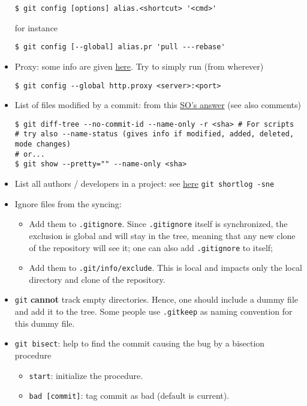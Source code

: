 \documentclass[a4paper,12pt,%
              final%
              ]{article}
\begin{document}
\begin{itemize}
\begin{verbatim}
$ git config [options] alias.<shortcut> '<cmd>'
\end{verbatim}
        for instance
\begin{verbatim}
$ git config [--global] alias.pr 'pull ---rebase'
\end{verbatim}
  \item Proxy: some info are given \href{https://gist.github.com/evantoli/f8c23a37eb3558ab8765}{here}. Try to simply run (from wherever)
\begin{verbatim}
$ git config --global http.proxy <server>:<port>
\end{verbatim}
  \item List of files modified by a commit: from this \href{https://stackoverflow.com/a/424142/12152457}{SO's answer} (see also comments)
\begin{verbatim}
$ git diff-tree --no-commit-id --name-only -r <sha> # For scripts
# try also --name-status (gives info if modified, added, deleted, mode changes)
# or...
$ git show --pretty="" --name-only <sha>
\end{verbatim}
  \item List all authors / developers in a project: see \href{https://stackoverflow.com/questions/9597410/list-all-developers-on-a-project-in-git}{here} \verb|git shortlog -sne|
  \item Ignore files from the syncing:
    \begin{itemize}
      \item Add them to \texttt{.gitignore}. Since \texttt{.gitignore} itself is synchronized, the exclusion is global and will stay in the tree, meaning that any new clone of the repository will see it; one can also add \texttt{.gitignore} to itself;
      \item Add them to \texttt{.git/info/exclude}. This is local and impacts only the local directory and clone of the repository.
    \end{itemize}
  \item \texttt{git} \textbf{cannot} track empty directories. Hence, one should include a dummy file and add it to the tree. Some people use \verb|.gitkeep| as naming convention for this dummy file.
  \item \texttt{git bisect}: help to find the commit causing the bug by a bisection procedure
    \begin{itemize}
      \item \verb|start|: initialize the procedure.
      \item \verb|bad [commit]|: tag commit as bad (default is current).

\end{itemize}
\end{itemize}
\end{document}
